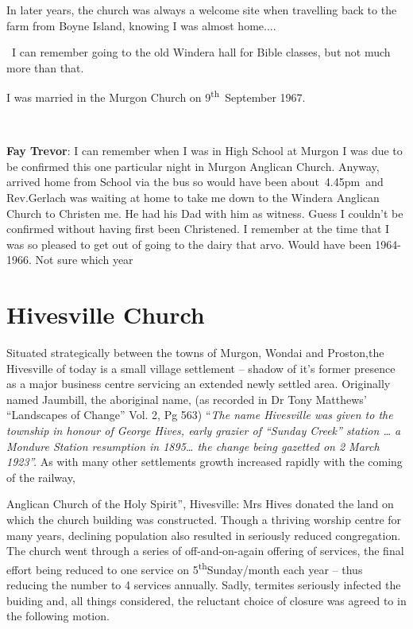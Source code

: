In later years, the church was always a welcome site when travelling
back to the farm from Boyne Island, knowing I was almost home....

~I can remember going to the old Windera hall for Bible classes, but not
much more than that.

I was married in the Murgon Church on 9\textsuperscript{th}~September
1967.

~

\textbf{Fay Trevor}: I can remember when I was in High School at Murgon
I was due to be confirmed this one particular night in Murgon Anglican
Church. Anyway, arrived home from School via the bus so would have been
about~4.45pm~and Rev.Gerlach was waiting at home to take me down to the
Windera Anglican Church to Christen me. He had his Dad with him as
witness. Guess I couldn't be confirmed without having first been
Christened. I remember at the time that I was so pleased to get out of
going to the dairy that arvo. Would have been 1964-1966. Not sure which
year

\hypertarget{hivesville-church}{%
\section{Hivesville Church}\label{hivesville-church}}

Situated strategically between the towns of Murgon, Wondai and
Proston,the Hivesville of today is a small village settlement -- shadow
of it's former presence as a major business centre servicing an extended
newly settled area. Originally named Jaumbill, the aboriginal name, (as
recorded in Dr Tony Matthews' ``Landscapes of Change'' Vol. 2, Pg 563)
``\emph{The name Hivesville was given to the township in honour of
George Hives, early grazier of ``Sunday Creek'' station \ldots{} a
Mondure Station resumption in 1895\ldots{} the change being gazetted on
2 March 1923''.} As with many other settlements growth increased rapidly
with the coming of the railway,

Anglican Church of the Holy Spirit'', Hivesville: Mrs Hives donated the
land on which the church building was constructed. Though a thriving
worship centre for many years, declining population also resulted in
seriously reduced congregation. The church went through a series of
off-and-on-again offering of services, the final effort being reduced to
one service on 5\textsuperscript{th}Sunday/month each year -- thus
reducing the number to 4 services annually. Sadly, termites seriously
infected the buiding and, all things considered, the reluctant choice of
closure was agreed to in the following motion.

